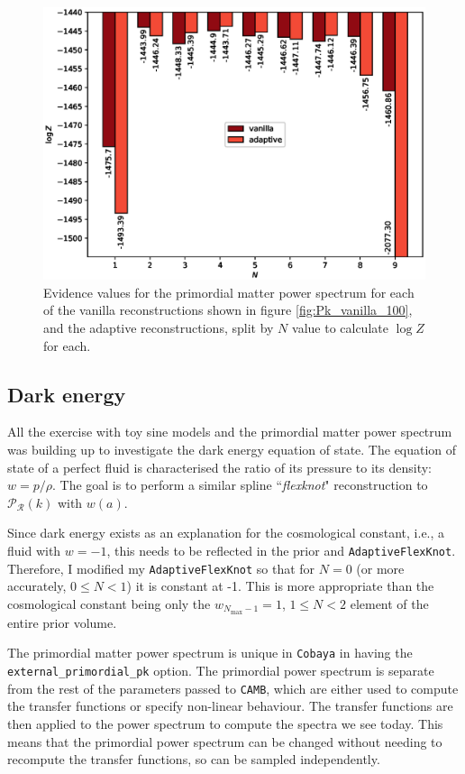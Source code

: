 \documentclass{article}
\begin{document}
\newpage

\begin{figure}[H]
  \centering
  \includegraphics[width=13cm]{PklogZ.eps}
  \caption{Evidence values for the primordial matter power spectrum for each of the vanilla reconstructions shown in figure \ref{fig:Pk_vanilla_100}, and the adaptive reconstructions, split by $N$ value to calculate $\log{Z}$ for each.}
  \label{fig:PklogZ}
\end{figure}

\subsection{Dark energy}
\label{sec:de}

All the exercise with toy sine models and the primordial matter power spectrum was building up to investigate the dark energy equation of state. The equation of state of a perfect fluid is characterised the ratio of its pressure to its density: $w = p/\rho$. The goal is to perform a similar spline ``\textit{flexknot}" reconstruction to $\mathcal P_\mathcal R(k)$ with $w(a)$.

Since dark energy exists as an explanation for the cosmological constant, i.e., a fluid with $w=-1$, this needs to be reflected in the prior and \texttt{AdaptiveFlexKnot}. Therefore, I modified my \texttt{AdaptiveFlexKnot} so that for $N=0$ (or more accurately, $0\le N <1$) it is constant at -1. This is more appropriate than the cosmological constant being only the $w_{N_\textrm{max}-1} = 1$, $1\le N<2$ element of the entire prior volume.

The primordial matter power spectrum is unique in \texttt{Cobaya} in having the \texttt{external\_primordial\_pk} option. The primordial power spectrum is separate from the rest of the parameters passed to \texttt{CAMB}, which are either used to compute the transfer functions or specify non-linear behaviour. The transfer functions are then applied to the power spectrum to compute the spectra we see today. This means that the primordial power spectrum can be changed without needing to recompute the transfer functions, so can be sampled independently.
\end{document}
